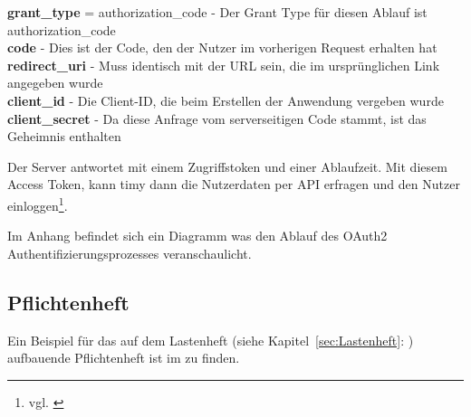 \textbf{grant\_type} = authorization\_code - Der Grant Type für diesen Ablauf ist authorization\_code \\
\textbf{code} - Dies ist der Code, den der Nutzer im vorherigen Request erhalten hat \\
\textbf{redirect\_uri} - Muss identisch mit der URL sein, die im ursprünglichen Link angegeben wurde \\
\textbf{client\_id} - Die Client-ID, die beim Erstellen der Anwendung vergeben wurde \\
\textbf{client\_secret} - Da diese Anfrage vom serverseitigen Code stammt, ist das Geheimnis enthalten

Der Server antwortet mit einem Zugriffstoken und einer Ablaufzeit. Mit diesem Access Token, kann timy dann die Nutzerdaten per API erfragen und den Nutzer einloggen\footnote{vgl. \cite{heise}}.

Im Anhang  befindet sich ein Diagramm was den Ablauf des OAuth2 Authentifizierungsprozesses veranschaulicht. 

\subsection{Pflichtenheft}
\label{sec:Pflichtenheft}

Ein Beispiel für das auf dem Lastenheft (siehe Kapitel~\ref{sec:Lastenheft}: ) aufbauende Pflichtenheft ist im  zu finden.


